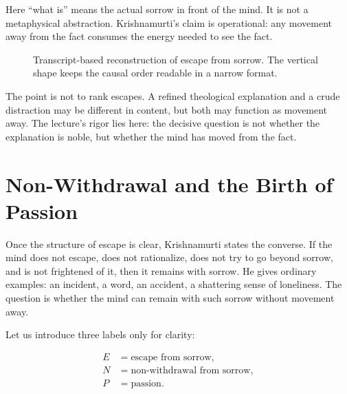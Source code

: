 Here ``what is'' means the actual sorrow in front of the mind. It is not a metaphysical abstraction. Krishnamurti's claim is operational: any movement away from the fact consumes the energy needed to see the fact.

\begin{figure}
\centering
{}
\caption{Transcript-based reconstruction of escape from sorrow. The vertical shape keeps the causal order readable in a narrow format.}
\end{figure}

The point is not to rank escapes. A refined theological explanation and a crude distraction may be different in content, but both may function as movement away. The lecture's rigor lies here: the decisive question is not whether the explanation is noble, but whether the mind has moved from the fact.

\section{Non-Withdrawal and the Birth of Passion}

Once the structure of escape is clear, Krishnamurti states the converse. If the mind does not escape, does not rationalize, does not try to go beyond sorrow, and is not frightened of it, then it remains with sorrow. He gives ordinary examples: an incident, a word, an accident, a shattering sense of loneliness. The question is whether the mind can remain with such sorrow without movement away.

Let us introduce three labels only for clarity:

\begin{align}
E &= \text{escape from sorrow},\\
N &= \text{non-withdrawal from sorrow},\\
P &= \text{passion}.
\end{align}

